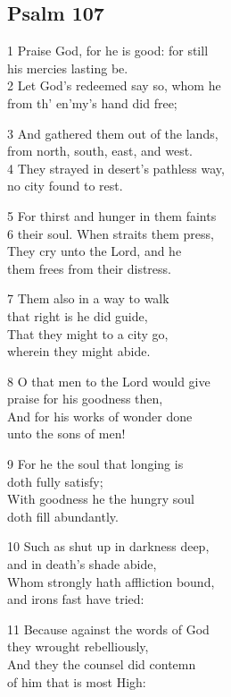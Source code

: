\subsection*{Psalm 107}

 1 Praise God, for he is good: for still\\
his mercies lasting be.\\
2 Let God’s redeemed say so, whom he\\
from th’ en’my’s hand did free;

3 And gathered them out of the lands,\\
from north, south, east, and west.\\
4 They strayed in desert’s pathless way,\\
no city found to rest.

5 For thirst and hunger in them faints\\
6 their soul. When straits them press,\\
They cry unto the Lord, and he\\
them frees from their distress.

7 Them also in a way to walk\\
that right is he did guide,\\
That they might to a city go,\\
wherein they might abide.

8 O that men to the Lord would give\\
praise for his goodness then,\\
And for his works of wonder done\\
unto the sons of men!

9 For he the soul that longing is\\
doth fully satisfy;\\
With goodness he the hungry soul\\
doth fill abundantly.

10 Such as shut up in darkness deep,\\
and in death’s shade abide,\\
Whom strongly hath affliction bound,\\
and irons fast have tried:

11 Because against the words of God\\
they wrought rebelliously,\\
And they the counsel did contemn\\
of him that is most High:

